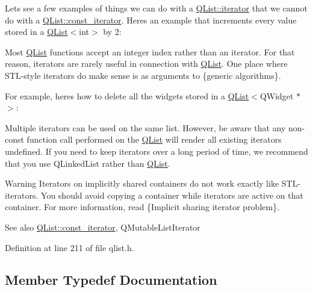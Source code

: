 \begin{DoxyCodeInclude}
\end{DoxyCodeInclude}
 Let\textquotesingle{}s see a few examples of things we can do with a \hyperlink{class_q_list_1_1iterator}{Q\+List\+::iterator} that we cannot do with a \hyperlink{class_q_list_1_1const__iterator}{Q\+List\+::const\+\_\+iterator}. Here\textquotesingle{}s an example that increments every value stored in a \hyperlink{class_q_list}{Q\+List}$<$int$>$ by 2\+:


\begin{DoxyCodeInclude}
\end{DoxyCodeInclude}
 Most \hyperlink{class_q_list}{Q\+List} functions accept an integer index rather than an iterator. For that reason, iterators are rarely useful in connection with \hyperlink{class_q_list}{Q\+List}. One place where S\+T\+L-\/style iterators do make sense is as arguments to \{generic algorithms\}.

For example, here\textquotesingle{}s how to delete all the widgets stored in a \hyperlink{class_q_list}{Q\+List}$<$Q\+Widget $\ast$$>$\+:


\begin{DoxyCodeInclude}
\end{DoxyCodeInclude}
 Multiple iterators can be used on the same list. However, be aware that any non-\/const function call performed on the \hyperlink{class_q_list}{Q\+List} will render all existing iterators undefined. If you need to keep iterators over a long period of time, we recommend that you use Q\+Linked\+List rather than \hyperlink{class_q_list}{Q\+List}.

\begin{DoxyWarning}{Warning}
Iterators on implicitly shared containers do not work exactly like S\+T\+L-\/iterators. You should avoid copying a container while iterators are active on that container. For more information, read \{Implicit sharing iterator problem\}.
\end{DoxyWarning}
\begin{DoxySeeAlso}{See also}
\hyperlink{class_q_list_1_1const__iterator}{Q\+List\+::const\+\_\+iterator}, Q\+Mutable\+List\+Iterator 
\end{DoxySeeAlso}


Definition at line 211 of file qlist.\+h.



\subsection{Member Typedef Documentation}
